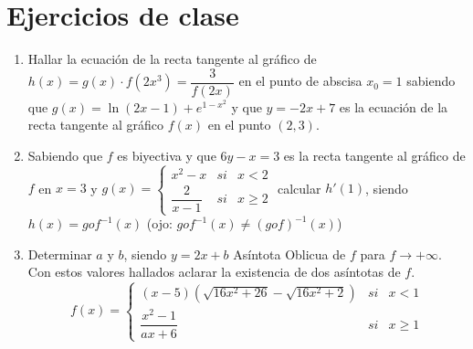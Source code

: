 \documentclass[12pt]{article}
\begin{document}
\section{Ejercicios de clase}
\begin{enumerate}
    \item Hallar la ecuación de la recta tangente al gráfico de ${h(x)=g(x) \cdot f(2x^3)=\dfrac{3}{f(2x)}}$ 
    en el punto de abscisa $x_0=1$ sabiendo que $g(x)=\ln\left( 2x-1 \right) + e^{1-x^2}$ y que $y=-2x+7$ es la ecuación de la recta tangente al gráfico $f(x)$ en el punto $(2, 3)$.

    \item Sabiendo que $f$ es biyectiva y que $6y-x=3$ es la recta tangente al gráfico de $f$ en $x=3$ y 
$\displaystyle g(x)=\left\{
\begin{array}{ccr}
     x^2-x & si & x<2 \\
     \dfrac{2}{x-1} & si & x \geq 2 
\end{array}\right.$ calcular $h'(1)$, siendo $h(x)=gof^{-1}(x)$ (ojo: $gof^{-1}(x) \neq (gof)^{-1}(x)$) 
\vspace{0.5cm}

    \item Determinar $a$ y $b$, siendo $y=2x+b$ Asíntota Oblicua de $f$ para $f \to +\infty$. Con estos valores hallados aclarar la existencia de dos asíntotas de $f$.
    \[f(x)=\left\{
    \begin{array}{ccr}
         \displaystyle (x-5)\left(\sqrt{16x^2+26} - \sqrt{16x^2+2} \right)& si & x<1 \\
         \dfrac{x^2-1}{ax+6} & si & x \geq 1 
    \end{array}
    \right.\]

\end{enumerate}



\newpage
\end{document}
